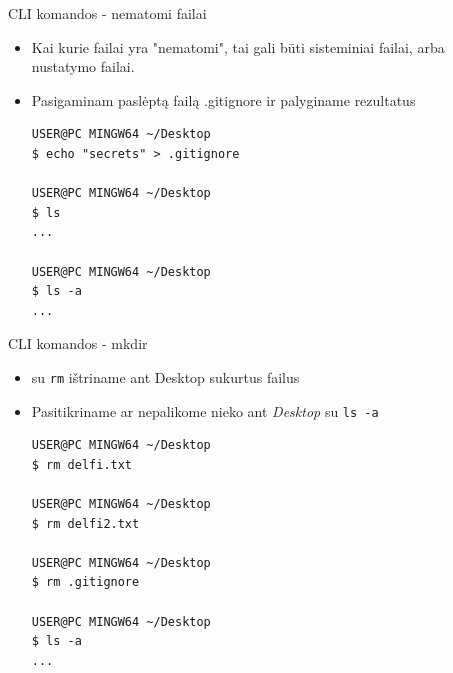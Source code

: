 \documentclass[11pt,xcolor=table]{beamer}
\begin{document}
\begin{frame}[fragile]{CLI komandos - nematomi failai}
\begin{itemize}
\item Kai kurie failai yra "nematomi", tai gali būti sisteminiai failai, arba nustatymo failai.
\item Pasigaminam paslėptą failą .gitignore ir palyginame rezultatus 

\begin{lstlisting}
USER@PC MINGW64 ~/Desktop
$ echo "secrets" > .gitignore

USER@PC MINGW64 ~/Desktop
$ ls
...

USER@PC MINGW64 ~/Desktop
$ ls -a
...
\end{lstlisting}
\end{itemize}
\end{frame}


\begin{frame}[fragile]{CLI komandos - mkdir}
\begin{itemize}
\item su \colorbox{listinggray}{\lstinline|rm|}  ištriname ant Desktop sukurtus failus
\item Pasitikriname ar nepalikome nieko ant \textit{Desktop} su \colorbox{listinggray}{\lstinline|ls -a|} 
\begin{lstlisting}
USER@PC MINGW64 ~/Desktop
$ rm delfi.txt

USER@PC MINGW64 ~/Desktop
$ rm delfi2.txt

USER@PC MINGW64 ~/Desktop
$ rm .gitignore

USER@PC MINGW64 ~/Desktop
$ ls -a
...

\end{lstlisting}
\end{itemize}
\end{frame}
\end{document}
